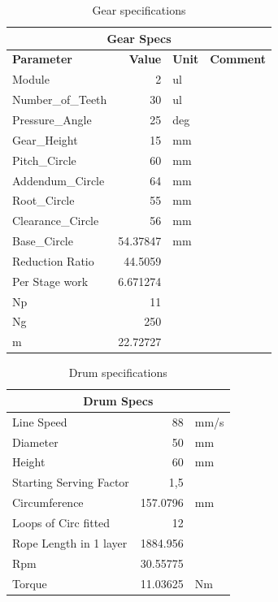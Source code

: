 \begin{table}[H]
  \centering
  \caption{Gear specifications}
  \begin{tabular}{|l|r|l|l|}
    \hline
    \multicolumn{4}{|c|}{\textbf{Gear Specs}} \\
    \hline
    \textbf{Parameter} & \textbf{Value} & \textbf{Unit} & \textbf{Comment} \\
    \hline
    Module & 2 & ul & \\
    Number\_of\_Teeth & 30 & ul & \\
    Pressure\_Angle & 25 & deg & \\
    Gear\_Height & 15 & mm & \\
    Pitch\_Circle & 60 & mm & \\
    Addendum\_Circle & 64 & mm & \\
    Root\_Circle & 55 & mm & \\
    Clearance\_Circle & 56 & mm & \\
    Base\_Circle & 54.37847 & mm & \\
    \hline
    Reduction Ratio & 44.5059 & & \\
    Per Stage work & 6.671274 & & \\
    Np & 11 & & \\
    Ng & 250 & & \\
    m & 22.72727 & & \\
    \hline
  \end{tabular}
  \label{tab:gear_specs}
\end{table}

\begin{table}[H]
  \centering
  \caption{Drum specifications}
  \begin{tabular}{|l|r|l|}
    \hline
    \multicolumn{3}{|c|}{\textbf{Drum Specs}} \\
    \hline
    Line Speed & 88 & mm/s \\
    Diameter & 50 & mm \\
    Height & 60 & mm \\
    Starting Serving Factor & 1,5 & \\
    Circumference & 157.0796 & mm \\
    Loops of Circ fitted & 12 & \\
    Rope Length in 1 layer & 1884.956 & \\
    Rpm & 30.55775 & \\
    Torque & 11.03625 & Nm \\
    \hline
  \end{tabular}
  \label{tab:drum_specs}
\end{table}

